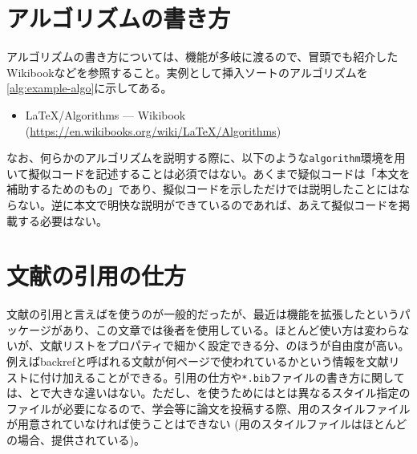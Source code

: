 \section{アルゴリズムの書き方}
\label{sec:write-algorithm}

アルゴリズムの書き方については、機能が多岐に渡るので、冒頭でも紹介したWikibookなどを参照すること。実例として挿入ソートのアルゴリズムを\cref{alg:example-algo}に示してある。
\begin{itemize}
  \item LaTeX/Algorithms --- Wikibook \\(\url{https://en.wikibooks.org/wiki/LaTeX/Algorithms})
\end{itemize}

なお、何らかのアルゴリズムを説明する際に、以下のような\texttt{algorithm}環境を用いて擬似コードを記述することは必須ではない。あくまで疑似コードは「本文を補助するためのもの」であり、擬似コードを示しただけでは説明したことにはならない。逆に本文で明快な説明ができているのであれば、あえて擬似コードを掲載する必要はない。

\begin{algorithm}[!h]
  \caption{アルゴリズムの例 (挿入ソート)}
  \label{alg:example-algo}
  \begin{algorithmic}[1]
    \EndWhile
    \EndFor
    \EndProcedure
  \end{algorithmic}
\end{algorithm}

\section{文献の引用の仕方}
\label{sec:cite-articles}

文献の引用と言えば\bibtex を使うのが一般的だったが、最近は機能を拡張した\biblatex というパッケージがあり、この文章では後者を使用している。ほとんど使い方は変わらないが、文献リストをプロパティで細かく設定できる分、\biblatex のほうが自由度が高い。例えばbackrefと呼ばれる文献が何ページで使われているかという情報を文献リストに付け加えることができる。引用の仕方や\texttt{*.bib}ファイルの書き方に関しては、\bibtex と\biblatex で大きな違いはない。ただし、\biblatex を使うためには\bibtex とは異なるスタイル指定のファイルが必要になるので、学会等に論文を投稿する際、\biblatex 用のスタイルファイルが用意されていなければ使うことはできない (\bibtex 用のスタイルファイルはほとんどの場合、提供されている)。

